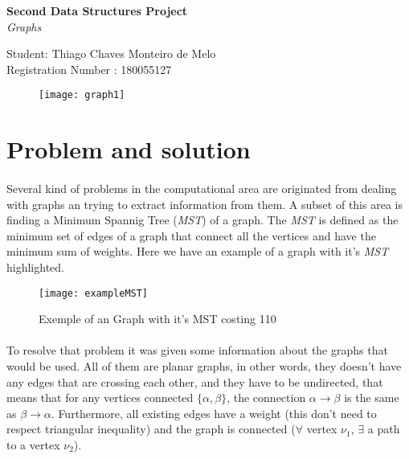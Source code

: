 \documentclass[titlepage]{article}
\begin{document}
    \begin{titlepage}
        \begin{center}
            {\bfseries\huge Second Data Structures Project}\\[0.5cm]
            {\LARGE\emph{Graphs}}\\[2cm]
        \end{center}
        \begin{flushleft}
            Student: Thiago Chaves Monteiro de Melo\\
            Registration Number : 180055127\\[3cm]
        \end{flushleft}

        \begin{figure}[h]
            \texttt{[image: graph1]}
        \end{figure}
          
    \end{titlepage}
    \section{Problem and solution}
    \paragraph{}
        Several kind of problems in the computational area are originated from dealing with graphs an trying to extract information from them. A subset of this area is finding a Minimum Spannig Tree (\emph{MST}) of a graph. The \emph{MST} is defined as the minimum set of edges of a graph that connect all the vertices and have the minimum sum of weights. Here we have an example of a graph with it's \emph{MST} highlighted.
    \begin{figure}[h]
        \texttt{[image: exampleMST]}
        \caption{Exemple of an Graph with it's MST costing 110}
    \end{figure}
    \paragraph{}
        To resolve that problem it was given some information about the graphs that would be used. All of them are planar graphs, in other words, they doesn't have any edges that are crossing each other, and they have to be undirected, that means that for any vertices connected $\{\alpha , \beta\}$, the connection $\alpha \rightarrow \beta$ is the same as $\beta \rightarrow \alpha$. Furthermore, all existing edges have a weight (this don't need to respect triangular inequality) and the graph is connected ($\forall$ vertex $\nu_1$, $\exists$ a path to a vertex $\nu_2$).
\end{document}
